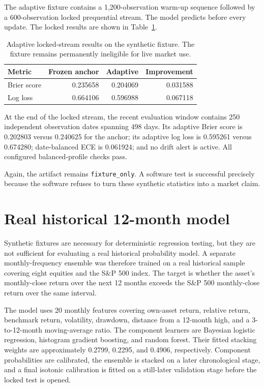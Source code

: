\documentclass[11pt]{article}
\begin{document}
The adaptive fixture contains a 1,200-observation warm-up sequence followed by a 600-observation locked prequential stream. The model predicts before every update. The locked results are shown in Table~\ref{tab:adaptresults}.

\begin{table}[tbp]
\centering
\small
\caption{Adaptive locked-stream results on the synthetic fixture. The fixture remains permanently ineligible for live market use.}
\label{tab:adaptresults}
\begin{tabular}{@{}lrrr@{}}
\toprule
Metric & Frozen anchor & Adaptive & Improvement \\
\midrule
Brier score & 0.235658 & 0.204069 & 0.031588 \\
Log loss & 0.664106 & 0.596988 & 0.067118 \\
\bottomrule
\end{tabular}
\end{table}

At the end of the locked stream, the recent evaluation window contains 250 independent observation dates spanning 498 days. Its adaptive Brier score is 0.202803 versus 0.240625 for the anchor; its adaptive log loss is 0.595261 versus 0.674280; date-balanced ECE is 0.061924; and no drift alert is active. All configured balanced-profile checks pass.

Again, the artifact remains \texttt{fixture\_only}. A software test is successful precisely because the software refuses to turn these synthetic statistics into a market claim.


\section{Real historical 12-month model}
\label{sec:realmodel}

Synthetic fixtures are necessary for deterministic regression testing, but they are not sufficient for evaluating a real historical probability model. A separate monthly-frequency ensemble was therefore trained on a real historical sample covering eight equities and the S\&P 500 index. The target is whether the asset's monthly-close return over the next 12 months exceeds the S\&P 500 monthly-close return over the same interval.

The model uses 20 monthly features covering own-asset return, relative return, benchmark return, volatility, drawdown, distance from a 12-month high, and a 3-to-12-month moving-average ratio. The component learners are Bayesian logistic regression, histogram gradient boosting, and random forest. Their fitted stacking weights are approximately 0.2799, 0.2295, and 0.4906, respectively. Component probabilities are calibrated, the ensemble is stacked on a later chronological stage, and a final isotonic calibration is fitted on a still-later validation stage before the locked test is opened.
\end{document}
